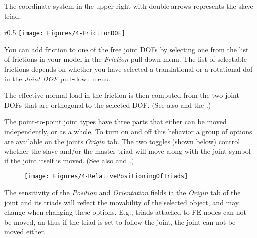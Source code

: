 \begin{bulletlist}
  \setcounter{enumi}{2}
\item
  The coordinate system in the upper right with double arrows represents
  the slave triad.
\end{bulletlist}

\begin{wrapfigure}[4]{r}{0.5\textwidth}
  \vspace{-3mm}
  \texttt{[image: Figures/4-FrictionDOF]}
\end{wrapfigure}

You can add friction to one of the free joint DOFs by selecting one from
the list of frictions in your model in the {\sl Friction} pull-down menu.
The list of selectable frictions depends on whether you have selected
a translational or a rotational dof in the {\sl Joint DOF} pull-down menu.

The effective normal load in the friction is then computed from the two
joint DOFs that are orthogonal to the selected DOF.
(See also 
and the .)



The point-to-point joint types have three parts that either can be moved
independently, or as a whole. To turn on and off this behavior a group
of options are available on the joints {\sl Origin} tab.
The two toggles (shown below) control whether the slave and/or the master triad
will move along with the joint symbol if the joint itself is moved.
(See also  and
.)

\begin{figure}[!h]
\center
\texttt{[image: Figures/4-RelativePositioningOfTriads]}
\end{figure}

The sensitivity of the {\sl Position} and {\sl Orientation} fields in
the {\sl Origin} tab of the joint and its triads will reflect the
movability of the selected object, and may change when changing these options.
E.g., triads attached to FE nodes can not be moved, an thus if
the triad is set to follow the joint, the joint can not be moved either.


